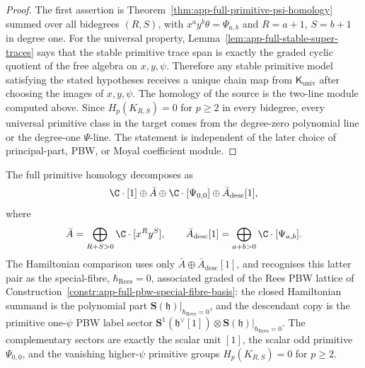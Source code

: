 \begin{proof}
  The first assertion is Theorem~\ref{thm:app-full-primitive-psi-homology}
  summed over all bidegrees \((R,S)\), with
  \(x^ay^b\theta=\Psi_{a,b}\) and \(R=a+1\), \(S=b+1\) in degree one.
  For the universal property,
  Lemma~\ref{lem:app-full-stable-super-traces} says that the stable
  primitive trace span is exactly the graded cyclic quotient of the free
  algebra on \(x,y,\psi\).  Therefore any stable primitive model satisfying
  the stated hypotheses receives a unique chain map from
  \(\mathsf K_{\mathrm{univ}}\) after choosing the images of \(x,y,\psi\).
  The homology of the source is the two-line module computed above.  Since
  \(H_p(K_{R,S})=0\) for \(p\ge2\) in every bidegree, every universal
  primitive class in the target comes from the degree-zero polynomial line
  or the degree-one \(\Psi\)-line.  The statement is independent of the
  later choice of principal-part, PBW, or Moyal coefficient module.
\end{proof}

\begin{thm}
\label{thm:app-full-hamiltonian-sector-extraction}
  The full primitive homology decomposes as
  \[
    \C\cdot[1]\oplus \bar A
      \oplus \C\cdot[\Psi_{0,0}]
      \oplus \bar A_{\mathrm{desc}}[1],
  \]
  where
  \[
    \bar A=\bigoplus_{R+S>0}\C\cdot[x^Ry^S],
    \qquad
    \bar A_{\mathrm{desc}}[1]
      =\bigoplus_{a+b>0}\C\cdot[\Psi_{a,b}].
  \]
  The Hamiltonian comparison uses only
  \(\bar A\oplus\bar A_{\mathrm{desc}}[1]\), and recognises this latter
  pair as the special-fibre, \(\hbar_{\mathrm{Rees}}=0\), associated graded of the Rees PBW lattice
  of Construction~\ref{constr:app-full-pbw-special-fibre-basis}: the
  closed Hamiltonian summand is the polynomial part
  \(\mathbf S(\mathfrak h)|_{\hbar_{\mathrm{Rees}}=0}\), and the descendant copy is the
  primitive one-\(\psi\) PBW label sector
  \(\mathbf S^1(\mathfrak h^\vee[1])\otimes\mathbf S(\mathfrak h)|_{\hbar_{\mathrm{Rees}}=0}\).
  The complementary sectors are exactly the scalar unit \([1]\), the
  scalar odd primitive
  \(\Psi_{0,0}\), and the vanishing higher-\(\psi\) primitive groups
  \(H_p(K_{R,S})=0\) for \(p\geq2\).
\end{thm}

